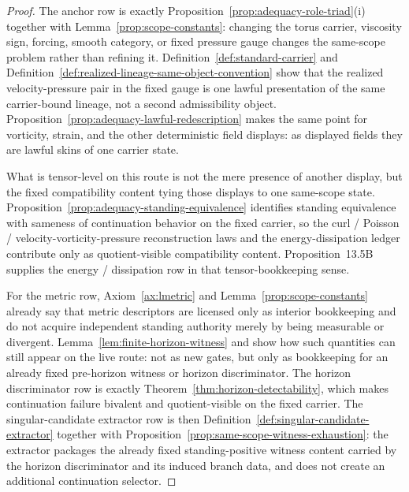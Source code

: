 \begin{proof}
The anchor row is exactly Proposition~\ref{prop:adequacy-role-triad}(i) together with Lemma~\ref{prop:scope-constants}: changing the torus carrier, viscosity sign, forcing, smooth category, or fixed pressure gauge changes the same-scope problem rather than refining it. Definition~\ref{def:standard-carrier} and Definition~\ref{def:realized-lineage-same-object-convention} show that the realized velocity-pressure pair in the fixed gauge is one lawful presentation of the same carrier-bound lineage, not a second admissibility object. Proposition~\ref{prop:adequacy-lawful-redescription} makes the same point for vorticity, strain, and the other deterministic field displays: as displayed fields they are lawful skins of one carrier state.

What is tensor-level on this route is not the mere presence of another display, but the fixed compatibility content tying those displays to one same-scope state. Proposition~\ref{prop:adequacy-standing-equivalence} identifies standing equivalence with sameness of continuation behavior on the fixed carrier, so the curl / Poisson / velocity-vorticity-pressure reconstruction laws and the energy-dissipation ledger contribute only as quotient-visible compatibility content. Proposition~13.5B supplies the energy / dissipation row in that tensor-bookkeeping sense.

For the metric row, Axiom~\ref{ax:lmetric} and Lemma~\ref{prop:scope-constants} already say that metric descriptors are licensed only as interior bookkeeping and do not acquire independent standing authority merely by being measurable or divergent. Lemma~\ref{lem:finite-horizon-witness} and \HorizonDetectabilityRef{} show how such quantities can still appear on the live route: not as new gates, but only as bookkeeping for an already fixed pre-horizon witness or horizon discriminator. The horizon discriminator row is exactly Theorem~\ref{thm:horizon-detectability}, which makes continuation failure bivalent and quotient-visible on the fixed carrier. The singular-candidate extractor row is then Definition~\ref{def:singular-candidate-extractor} together with Proposition~\ref{prop:same-scope-witness-exhaustion}: the extractor packages the already fixed standing-positive witness content carried by the horizon discriminator and its induced branch data, and does not create an additional continuation selector.
\end{proof}

